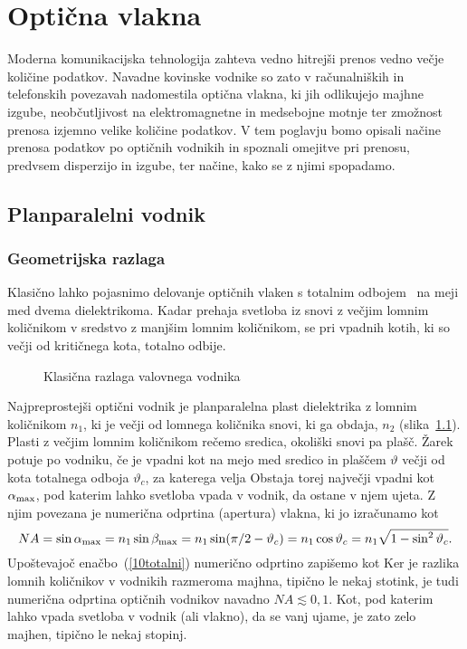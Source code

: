 
\chapter{Optična vlakna}
Moderna komunikacijska tehnologija zahteva vedno hitrejši prenos
vedno večje količine podatkov. Navadne kovinske vodnike
so zato v računalniških in telefonskih povezavah nadomestila optična 
vlakna, ki jih odlikujejo majhne izgube, neobčutljivost na elektromagnetne
in medsebojne motnje ter zmožnost prenosa izjemno velike količine podatkov. 
V tem poglavju bomo opisali načine prenosa podatkov po optičnih vodnikih
in spoznali omejitve pri prenosu,
predvsem disperzijo in izgube, ter načine, kako se z njimi 
spopadamo.

\section{Planparalelni vodnik}
\subsection*{Geometrijska razlaga}
Klasično lahko pojasnimo delovanje optičnih vlaken s totalnim odbojem~
na meji med dvema dielektrikoma. Kadar prehaja svetloba iz snovi 
z večjim lomnim količnikom v sredstvo z manjšim lomnim količnikom,
se pri vpadnih kotih, ki so večji od kritičnega kota, totalno odbije. 
\begin{figure}[h]
\centering
\def\svgwidth{110truemm} 

\caption{Klasična razlaga valovnega vodnika}
\label{fig:vodnik}
\end{figure}

Najpreprostejši optični vodnik je planparalelna plast 
dielektrika z lomnim količnikom $n_{1}$, ki je večji od lomnega količnika 
snovi, ki ga obdaja, $n_2$ (slika~\ref{fig:vodnik}). 
Plasti z večjim lomnim količnikom rečemo sredica, okoliški snovi 
pa plašč. Žarek potuje po vodniku, če je vpadni kot 
na mejo med sredico in plaščem $\vartheta$ večji od kota totalnega odboja $\vartheta_c$, 
za katerega velja
Obstaja torej največji vpadni kot $\alpha_{\rm max}$, pod katerim 
lahko svetloba vpada v vodnik, da ostane v njem ujeta.
Z njim povezana je numerična odprtina (apertura) vlakna, 
ki jo izračunamo kot 
\begin{equation}
NA = \sin \alpha_{\rm max} = n_1 \sin \beta_{\rm max} = 
n_1 \sin(\pi/2-\vartheta_c) =
n_1 \cos\vartheta_c = n_1 \sqrt{1-\sin^2\vartheta_c}.
\label{10NAa}
\end{equation}
Upoštevajoč enačbo~(\ref{10totalni}) numerično odprtino zapišemo kot 
Ker je razlika lomnih količnikov v vodnikih razmeroma majhna,
tipično le nekaj stotink, je tudi numerična odprtina optičnih 
vodnikov navadno
$NA \lesssim 0,1 $. Kot, pod katerim lahko vpada svetloba
v vodnik (ali vlakno), da se vanj ujame, je zato zelo majhen, tipično le nekaj stopinj.

